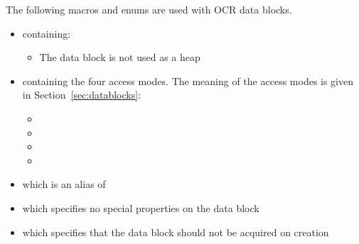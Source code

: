 The following macros and enums are used with OCR data blocks.
\begin{itemize}
\item \hypertarget{type_ocrInDbAllocator_t}{} containing:
  \begin{itemize}
  \item {} The data block is not used as a heap
  \end{itemize}
\item \hypertarget{type_ocrDbAccessMode_t}{}
  containing the four access modes. The
  meaning of the access modes is given in Section~\ref{sec:datablocks}:
  \begin{itemize}
    \item {}
    \item {}
    \item {}
    \item {}
  \end{itemize}
\item {} which is an alias of 
\item {} which specifies no special properties on the data block
\item {} which specifies that the data block should
  not be acquired on creation
\end{itemize}


